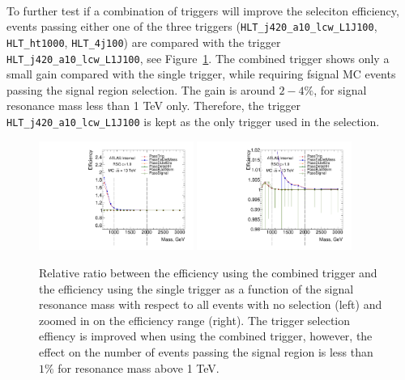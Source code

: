 \paragraph{} To further test if a combination of triggers will improve the seleciton efficiency, events passing either one of the three triggers (\verb|HLT_j420_a10_lcw_L1J100|, \verb|HLT_ht1000|, \verb|HLT_4j100|) are compared with the trigger \verb|HLT_j420_a10_lcw_L1J100|, see Figure~\ref{fig:app-trig-releff-mass}. The combined trigger shows only a small gain compared with the single trigger, while requiring fsignal MC events passing the signal region selection. The gain is around $2-4\%$, for signal resonance mass less than 1 TeV only. Therefore, the trigger \verb|HLT_j420_a10_lcw_L1J100| is kept as the only trigger used in the selection.

\begin{figure}[htbp!]
\begin{center}
\includegraphics[angle=270, width=0.45\textwidth]{./figures/boosted/Trigger/evtsel_test_noveto_Efficiency_All_ref_full.pdf}
\includegraphics[angle=270, width=0.45\textwidth]{./figures/boosted/Trigger/evtsel_test_noveto_Efficiency_All_ref_zoom.pdf}
  \caption{Relative ratio between the efficiency using the combined trigger and the efficiency using the single trigger as a function of the signal resonance mass with respect to all events with no selection (left) and zoomed in on the efficiency range (right). The trigger selection effiency is improved when using the combined trigger, however, the effect on the number of events passing the signal region is less than $1\%$ for resonance mass above 1 TeV.}
\label{fig:app-trig-releff-mass}
\end{center}
\end{figure}
